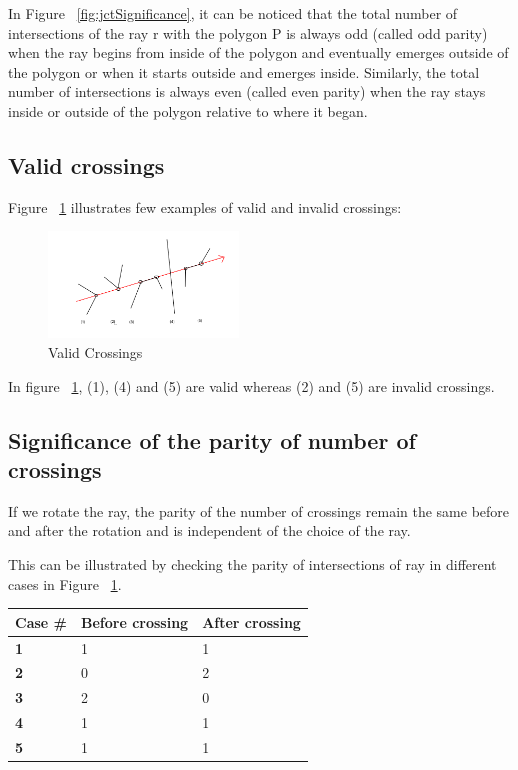 \documentclass{article}
\begin{document}
In Figure ~\ref{fig:jctSignificance}, it can be noticed that the total number of intersections of the ray r with the polygon P is always odd (called odd parity) when the ray begins from inside of the polygon and eventually emerges outside of the polygon or when it starts outside and emerges inside. Similarly, the total number of intersections is always even (called even parity) when the ray stays inside or outside of the polygon relative to where it began.\\

\subsection{Valid crossings}
Figure ~\ref{fig:validCrossings} illustrates few examples of valid and invalid crossings:
\begin{figure}[h]
    \centering
    \includegraphics[width=0.45\textwidth]{images/validCrossings.png}
    \caption{Valid Crossings}
    \label{fig:validCrossings}
\end{figure}

In figure ~\ref{fig:validCrossings}, (1), (4) and (5) are valid whereas (2) and (5) are invalid crossings.

\subsection{Significance of the parity of number of crossings}
If we rotate the ray, the parity of the number of crossings remain the same before and after the rotation and is independent of the choice of the ray.

This can be illustrated by checking the parity of intersections of ray in different cases in Figure ~\ref{fig:validCrossings}.\\

\begin{table}[h]
\begin{tabular}{|l|l|l|}
\hline
\textbf{Case \#} & \textbf{Before crossing} & \textbf{After crossing} \\ \hline
\textbf{1}       & 1                        & 1                       \\ \hline
\textbf{2}       & 0                        & 2                       \\ \hline
\textbf{3}       & 2                        & 0                       \\ \hline
\textbf{4}       & 1                        & 1                       \\ \hline
\textbf{5}       & 1                        & 1                       \\ \hline
\end{tabular}
\end{table}
\end{document}
